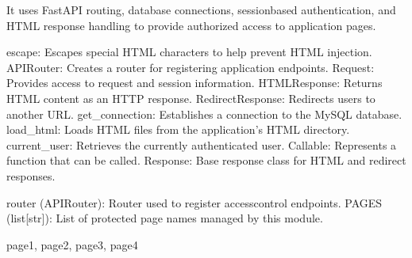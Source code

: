 \documentclass[letterpaper,10pt,english]{sphinxmanual}
\begin{document}
\sphinxAtStartPar
It uses FastAPI routing, database connections, session\sphinxhyphen{}based authentication,
and HTML response handling to provide authorized access to application pages.
\begin{description}
\sphinxAtStartPar
escape: Escapes special HTML characters to help prevent HTML injection.
APIRouter: Creates a router for registering application endpoints.
Request: Provides access to request and session information.
HTMLResponse: Returns HTML content as an HTTP response.
RedirectResponse: Redirects users to another URL.
get\_connection: Establishes a connection to the MySQL database.
load\_html: Loads HTML files from the application’s HTML directory.
current\_user: Retrieves the currently authenticated user.
Callable: Represents a function that can be called.
Response: Base response class for HTML and redirect responses.

\sphinxAtStartPar
router (APIRouter): Router used to register access\sphinxhyphen{}control endpoints.
PAGES (list{[}str{]}): List of protected page names managed by this module.

\sphinxAtStartPar
page1, page2, page3, page4

\end{description}
\end{document}
